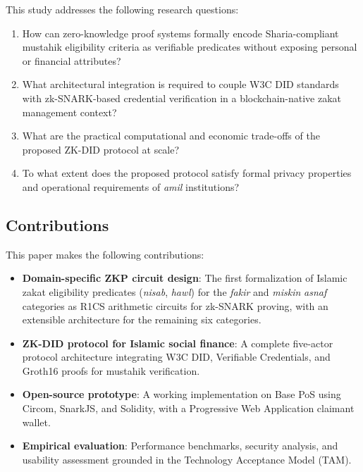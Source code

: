 \documentclass[conference]{IEEEtran}
\begin{document}
This study addresses the following research questions:

\begin{enumerate}
    \item[\textbf{RQ1}:] How can zero-knowledge proof systems formally encode Sharia-compliant mustahik eligibility criteria as verifiable predicates without exposing personal or financial attributes?
    \item[\textbf{RQ2}:] What architectural integration is required to couple W3C DID standards with zk-SNARK-based credential verification in a blockchain-native zakat management context?
    \item[\textbf{RQ3}:] What are the practical computational and economic trade-offs of the proposed ZK-DID protocol at scale?
    \item[\textbf{RQ4}:] To what extent does the proposed protocol satisfy formal privacy properties and operational requirements of \textit{amil} institutions?
\end{enumerate}

\subsection{Contributions}

This paper makes the following contributions:

\begin{itemize}
    \item \textbf{Domain-specific ZKP circuit design}: The first formalization of Islamic zakat eligibility predicates (\textit{nisab}, \textit{hawl}) for the \textit{fakir} and \textit{miskin} \textit{asnaf} categories as R1CS arithmetic circuits for zk-SNARK proving, with an extensible architecture for the remaining six categories.
    \item \textbf{ZK-DID protocol for Islamic social finance}: A complete five-actor protocol architecture integrating W3C DID, Verifiable Credentials, and Groth16 proofs for mustahik verification.
    \item \textbf{Open-source prototype}: A working implementation on Base PoS using Circom, SnarkJS, and Solidity, with a Progressive Web Application claimant wallet.
    \item \textbf{Empirical evaluation}: Performance benchmarks, security analysis, and usability assessment grounded in the Technology Acceptance Model (TAM).
\end{itemize}

\end{document}
